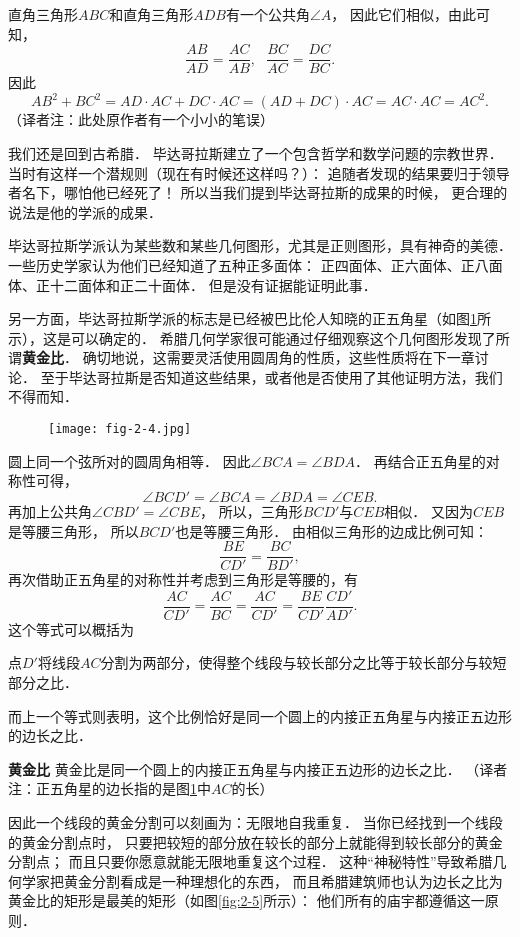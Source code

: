 \documentclass[cn,fancy,blue,11pt]{elegantbook}
\begin{document}
直角三角形$ABC$和直角三角形$ADB$有一个公共角$\angle A$，
因此它们相似，由此可知，
\[\frac{AB}{AD}=\frac{AC}{AB},~~~\frac{BC}{AC}=\frac{DC}{BC}.\]
因此\[AB^2+BC^2=AD\cdot AC+DC\cdot AC=(AD+DC)\cdot AC=AC\cdot AC=AC^2.\]
（译者注：此处原作者有一个小小的笔误）

我们还是回到古希腊．
毕达哥拉斯建立了一个包含哲学和数学问题的宗教世界．
当时有这样一个潜规则（现在有时候还这样吗？）：
追随者发现的结果要归于领导者名下，哪怕他已经死了！
所以当我们提到毕达哥拉斯的成果的时候，
更合理的说法是他的学派的成果．

毕达哥拉斯学派认为某些数和某些几何图形，尤其是正则图形，具有神奇的美德．
一些历史学家认为他们已经知道了五种正多面体：
正四面体、正六面体、正八面体、正十二面体和正二十面体．
但是没有证据能证明此事．

另一方面，毕达哥拉斯学派的标志是已经被巴比伦人知晓的正五角星（如图\ref{fig:2-4}所示），这是可以确定的．
希腊几何学家很可能通过仔细观察这个几何图形发现了所谓\textbf{黄金比}．
确切地说，这需要灵活使用圆周角的性质，这些性质将在下一章讨论．
至于毕达哥拉斯是否知道这些结果，或者他是否使用了其他证明方法，我们不得而知．

\begin{figure}[htbp]
	\centering
	\texttt{[image: fig-2-4.jpg]}
	\caption{\label{fig:2-4}}
\end{figure}

圆上同一个弦所对的圆周角相等．
因此$\angle BCA=\angle BDA$．
再结合正五角星的对称性可得，
\[\angle BCD'=\angle BCA=\angle BDA=\angle CEB.\]
再加上公共角$\angle CBD'=\angle CBE$，
所以，三角形$BCD'$与$CEB$相似．
又因为$CEB$是等腰三角形，
所以$BCD'$也是等腰三角形．
由相似三角形的边成比例可知：
\[\frac{BE}{CD'}=\frac{BC}{BD'},\]
再次借助正五角星的对称性并考虑到三角形是等腰的，有
\[\frac{AC}{CD'}=\frac{AC}{BC}=\frac{AC}{CD'}=\frac{BE}{CD'}\frac{CD'}{AD'}.\]
这个等式可以概括为
\begin{framed}
	点$D'$将线段$AC$分割为两部分，使得整个线段与较长部分之比等于较长部分与较短部分之比．
\end{framed}
而上一个等式则表明，这个比例恰好是同一个圆上的内接正五角星与内接正五边形的边长之比．

\textbf{黄金比} 黄金比是同一个圆上的内接正五角星与内接正五边形的边长之比．
（译者注：正五角星的边长指的是图\ref{fig:2-4}中$AC$的长）

因此一个线段的黄金分割可以刻画为：无限地自我重复．
当你已经找到一个线段的黄金分割点时，
只要把较短的部分放在较长的部分上就能得到较长部分的黄金分割点；
而且只要你愿意就能无限地重复这个过程．
这种``神秘特性''导致希腊几何学家把黄金分割看成是一种理想化的东西，
而且希腊建筑师也认为边长之比为黄金比的矩形是最美的矩形（如图\ref{fig:2-5}所示）：
他们所有的庙宇都遵循这一原则．
\end{document}
